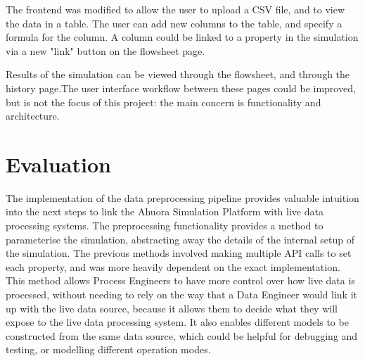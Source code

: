The frontend was modified to allow the user to upload a CSV file, and to view the data in a table. The user can add new columns to the table, and specify a formula for the column. A column could be linked to a property in the simulation via a new "link" button on the flowsheet page. 

Results of the simulation can be viewed through the flowsheet, and through the history page.The user interface workflow between these pages could be improved, but is not the focus of this project: the main concern is functionality and architecture.

\section{Evaluation}

The implementation of the data preprocessing pipeline provides valuable intuition into the next steps to link the Ahuora Simulation Platform with live data processing systems. The preprocessing functionality provides a method to parameterise the simulation, abstracting away the details of the internal setup of the simulation. The previous methods involved making multiple API calls to set each property, and was more heavily dependent on the exact implementation. This method allows Process Engineers to have more control over how live data is processed, without needing to rely on the way that a Data Engineer would link it up with the live data source, because it allows them to decide what they will expose to the live data processing system. It also enables different models to be constructed from the same data source, which could be helpful for debugging and testing, or modelling different operation modes.











